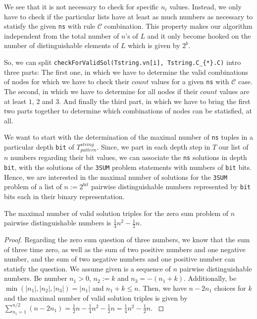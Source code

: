 We see that it is not necessary to check for specific $n_{i}$ values. Instead, we only have to check if the particular lists have at least as much numbers as necessary to statisfy the given \texttt{ns} with rule $\mathcal{C}$ combination. This property makes our algorithm independent from the total number of $n$'s of $L$ and it only become hooked on the number of distinguishable elements of $L$ which is given by $2^{b}$.

So, we can split \texttt{checkForValidSol(Tstring.vn[i], Tstring.C\_\{*\}.C)} intro three parts: The first one, in which we have to determine the valid combinations of nodes for which we have to check their $count$ values for a given \texttt{ns} with $\mathcal{C}$ case. The second, in which we have to determine for all nodes if their $count$ values are at least $1$, $2$ and $3$. And finally the third part, in which we have to bring the first two parts together to determine which combinations of nodes can be statisfied, at all.

We want to start with the determination of the maximal number of \texttt{ns} tuples in a particular depth \texttt{bit} of $T^{string}_{pattern}$. Since, we part in each depth step in $T$ our list of $n$ numbers regarding their bit values, we can associate the \texttt{ns} solutions in depth \texttt{bit}, with the solutions of the \texttt{3SUM} problem statements with numbers of \texttt{bit} bits. Hence, we are interested in the maximal number of solutions for the \texttt{3SUM} problem of a list of $n := 2^{bit}$ pairwise distinguishable numbers represented by \texttt{bit} bits each in their binary representation.   


\begin{lemma}
    The maximal number of valid solution triples for the zero sum problem of $n$ pairwise distinguishable numbers is $\frac{1}{4}n^{2} - \frac{1}{2}n$.
\label{lemma:maximalnumberofsoldisnumbers}
\end{lemma}


\begin{proof}
    Regarding the zero sum question of three numbers, we know that the sum of three time zero, as well as the sum of two positive numbers and one negative number, and the sum of two negative numbers and one positive number can statisfy the question. We assume given is a sequence of $n$ pairwise distinguishable numbers. Be number $n_{1} > 0$, $n_{2} := k$ and $n_{3} = -\left(n_{1} + k\right)$. Additionally, be $\min\left(|n_{1}|, |n_{2}|, |n_{3}|\right) = |n_{1}|$ and $n_{1} + k \leq n$. Then, we have $n - 2n_{1}$ choices for $k$ and the maximal number of valid solution triples is given by $\sum_{n_{1} = 1}^{n/2} \left(n - 2n_{1}\right) = \frac{1}{2}n - \frac{1}{4}n^{2} - \frac{1}{2}n = \frac{1}{4}n^{2} - \frac{1}{2}n$.
\label{proof:maximalnumberofsoldisnumbers}
\end{proof}


